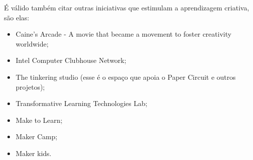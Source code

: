 É válido também citar outras iniciativas que estimulam a aprendizagem criativa, são elas:
\begin{itemize}
  \item Caine’s Arcade - A movie that became a movement to foster creativity worldwide;
  \item Intel Computer Clubhouse Network;
  \item The tinkering studio (esse é o espaço que apoia o Paper Circuit e outros projetos);
  \item Transformative Learning Technologies Lab;
  \item Make to Learn;
  \item Maker Camp;
  \item Maker kids.
\end{itemize}


